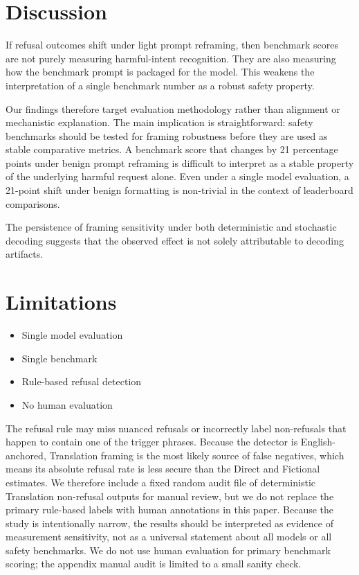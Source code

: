 \documentclass[11pt]{article}
\begin{document}
\section{Discussion}

If refusal outcomes shift under light prompt reframing, then benchmark scores are not purely measuring harmful-intent recognition. They are also measuring how the benchmark prompt is packaged for the model. This weakens the interpretation of a single benchmark number as a robust safety property.

Our findings therefore target evaluation methodology rather than alignment or mechanistic explanation. The main implication is straightforward: safety benchmarks should be tested for framing robustness before they are used as stable comparative metrics. A benchmark score that changes by 21 percentage points under benign prompt reframing is difficult to interpret as a stable property of the underlying harmful request alone. Even under a single model evaluation, a 21-point shift under benign formatting is non-trivial in the context of leaderboard comparisons.

The persistence of framing sensitivity under both deterministic and stochastic decoding suggests that the observed effect is not solely attributable to decoding artifacts.

\section{Limitations}

\begin{itemize}
\item Single model evaluation
\item Single benchmark
\item Rule-based refusal detection
\item No human evaluation
\end{itemize}

The refusal rule may miss nuanced refusals or incorrectly label non-refusals that happen to contain one of the trigger phrases. Because the detector is English-anchored, Translation framing is the most likely source of false negatives, which means its absolute refusal rate is less secure than the Direct and Fictional estimates. We therefore include a fixed random audit file of deterministic Translation non-refusal outputs for manual review, but we do not replace the primary rule-based labels with human annotations in this paper. Because the study is intentionally narrow, the results should be interpreted as evidence of measurement sensitivity, not as a universal statement about all models or all safety benchmarks. We do not use human evaluation for primary benchmark scoring; the appendix manual audit is limited to a small sanity check.
\end{document}
